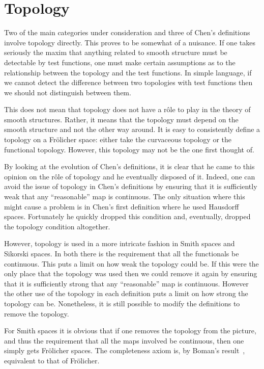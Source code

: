 \documentclass[%
a4paper,%
arxiv,%
defaults
]{myclass}
\begin{document}
\section{Topology}
\label{sec:topology}

Two of the main categories under consideration and three of Chen's definitions involve topology directly.
This proves to be somewhat of a nuisance.
If one takes seriously the maxim that anything related to smooth structure must be detectable by test functions, one must make certain assumptions as to the relationship between the topology and the test functions.
In simple language, if we cannot detect the difference between two topologies with test functions then we should not distinguish between them.

This does not mean that topology does not have a r\^ole to play in the theory of smooth structures.
Rather, it means that the topology must depend on the smooth structure and not the other way around.
It is easy to consistently define a topology on a Fr\"olicher space: either take the curvaceous topology or the functional topology.
However, this topology may not be the one first thought of.

By looking at the evolution of Chen's definitions, it is clear that he came to this opinion on the r\^ole of topology and he eventually disposed of it.
Indeed, one can avoid the issue of topology in Chen's definitions by ensuring that it is sufficiently weak that any ``reasonable'' map is continuous.
The only situation where this might cause a problem is in Chen's first definition where he used Hausdorff spaces.
Fortunately he quickly dropped this condition and, eventually, dropped the topology condition altogether.

However, topology is used in a more intricate fashion in Smith spaces and Sikorski spaces.
In both there is the requirement that all the functionals be continuous.
This puts a limit on how weak the topology could be.
If this were the only place that the topology was used then we could remove it again by ensuring that it is sufficiently strong that any ``reasonable'' map is continuous.
However the other use of the topology in each definition puts a limit on how strong the topology can be.
Nonetheless, it is still possible to modify the definitions to remove the topology.

For Smith spaces it is obvious that if one removes the topology from the picture, and thus the requirement that all the maps involved be continuous, then one simply gets Fr\"olicher spaces.
The completeness axiom is, by Boman's result~\cite{jb3}, equivalent to that of Fr\"olicher.
\end{document}
